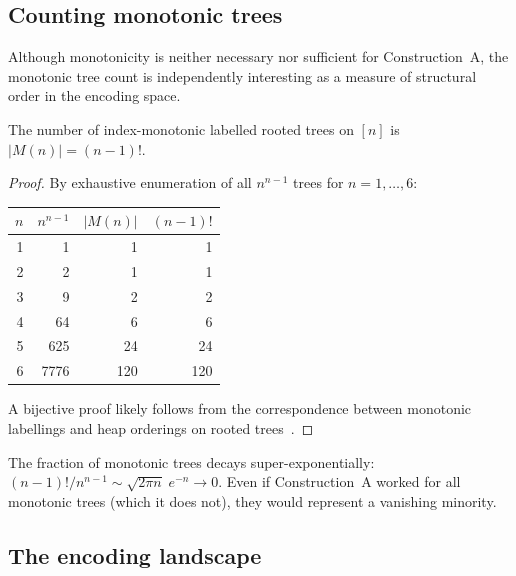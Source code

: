 \subsection{Counting monotonic trees}
\label{sec:st-counting}

Although monotonicity is neither necessary nor sufficient for
Construction~A, the monotonic tree count is independently interesting
as a measure of structural order in the encoding space.

\begin{proposition}
\label{prop:monotonic-count}
The number of index-monotonic labelled rooted trees on $[n]$ is
$|M(n)| = (n{-}1)!$.
\end{proposition}

\begin{proof}
By exhaustive enumeration of all $n^{n-1}$ trees for $n = 1, \ldots, 6$:

\begin{center}
\begin{tabular}{@{}rrrr@{}}
\toprule
$n$ & $n^{n-1}$ & $|M(n)|$ & $(n{-}1)!$ \\
\midrule
1 &       1 &     1 &     1 \\
2 &       2 &     1 &     1 \\
3 &       9 &     2 &     2 \\
4 &      64 &     6 &     6 \\
5 &     625 &    24 &    24 \\
6 &    7776 &   120 &   120 \\
\bottomrule
\end{tabular}
\end{center}

A bijective proof likely follows from the correspondence between
monotonic labellings and heap orderings on rooted
trees~\cite{bergeron1992}.
\end{proof}

\begin{corollary}
The fraction of monotonic trees decays super-exponentially:
$(n{-}1)!/n^{n-1} \sim \sqrt{2\pi n}\;e^{-n} \to 0$.
Even if Construction~A worked for all monotonic trees (which it does
not), they would represent a vanishing minority.
\end{corollary}

\subsection{The encoding landscape}
\label{sec:st-landscape}

